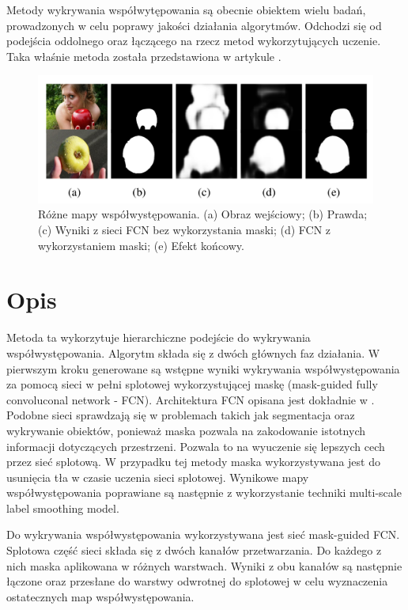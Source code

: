 \documentclass[a4paper,11pt, notitlepage, twosides, openany ]{report}
\begin{document}
	Metody wykrywania współwytępowania są obecnie obiektem wielu badań, prowadzonych w celu poprawy jakości działania algorytmów. Odchodzi się od podejścia oddolnego oraz łączącego na rzecz metod wykorzytujących uczenie. Taka właśnie metoda została przedstawiona w artykule \cite{Zhang_2019_CVPR}. 

	\begin{figure}[h!]
		\centering
		\includegraphics[width=1\textwidth]{steps.png}
		\caption{Różne mapy współwystępowania. (a) Obraz wejściowy; (b) Prawda; (c) Wyniki z sieci FCN bez wykorzystania maski; (d) FCN z wykorzystaniem maski; (e)  Efekt końcowy.}
		\label{step}
	\end{figure}

	\section{Opis}
	Metoda ta wykorzytuje hierarchiczne podejście do wykrywania współwystępowania. Algorytm składa się z dwóch głównych faz działania. W pierwszym kroku generowane są wstępne wyniki wykrywania współwystępowania za pomocą sieci w pełni splotowej wykorzystującej maskę (mask-guided fully convoluconal network - FCN). Architektura FCN opisana jest dokładnie w \cite{10.1109/TPAMI.2016.2572683}.	Podobne sieci sprawdzają się w problemach takich jak segmentacja oraz wykrywanie obiektów, ponieważ maska pozwala na zakodowanie istotnych informacji dotyczących przestrzeni. Pozwala to na wyuczenie się lepszych cech przez sieć splotową. W przypadku tej metody maska wykorzystywana jest do usunięcia tła w czasie uczenia sieci splotowej. Wynikowe mapy współwystępowania poprawiane są następnie z wykorzystanie techniki multi-scale label smoothing model.

	

	Do wykrywania współwystępowania wykorzystywana jest sieć mask-guided FCN. Splotowa część sieci składa się z dwóch kanałów przetwarzania. Do każdego z nich maska aplikowana w różnych warstwach. Wyniki z obu kanałów są następnie łączone oraz przesłane do warstwy odwrotnej do splotowej w celu wyznaczenia ostatecznych map współwystępowania.
	
\end{document}
